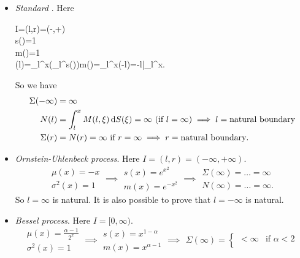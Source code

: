 \documentclass[12pt]{report}
\begin{document}
\begin{itemize}
	\item \emph{Standard \bwm}. Here
	\begin{carray}
		I=(l,r)=(-\infty,+\infty)\\
		s(\xi)=1\\
		m(\xi)=1\\
		\Sigma(l)=\int_{l}^{x}\left(\int_{l}^{\xi}s(\eta)\dif\eta\right)m(\xi)\dif\xi=\int_{l}^{x}(\xi-l)\dif\xi=-l\xi\Big|_{l}^{x}.
	\end{carray}
	So we have
	\begin{align*}
		\Sigma(-\infty)&=\infty\\
		N(l)&=\int_{l}^{x}M(l,\xi)\mathop{}\!\mathrm{d} S(\xi)=\infty\text{ (if $l=\infty$)}\implies l=\text{natural boundary}\\
		\Sigma(r)&=N(r)=\infty\text{ if }r=\infty\implies r=\text{natural boundary}.
	\end{align*}
	\item \emph{Ornstein-Uhlenbeck process}. Here $I=(l,r)=(-\infty,+\infty)$.
	\begin{equation*}
		\begin{array}{l}
			\mu(x)=-x\\
			\sigma^{2}(x)=1
		\end{array}\implies\begin{array}{l}
		s(x)=e^{x^{2}}\\
		m(x)=e^{-x^{2}}
		\end{array}\implies\begin{array}{l}
		\Sigma(\infty)=\ldots=\infty\\
		N(\infty)=\ldots=\infty.
		\end{array}
	\end{equation*}
	So $l=\infty$ is natural. It is also possible to prove that $l=-\infty$ is natural.
	\item \emph{Bessel process}. Here $I=[0,\infty)$.
	\begin{equation*}
		\begin{array}{l}
			\mu(x)=\frac{\alpha-1}{2^{x}}\\
			\sigma^{2}(x)=1
		\end{array}\implies\begin{array}{l}
			s(x)=x^{1-\alpha}\\
			m(x)=x^{\alpha-1}
		\end{array}\implies\begin{array}{l}
			\Sigma(\infty)=\begin{cases}
				<\infty&\text{if }\alpha<2\\

\end{cases}
\end{array}
\end{equation*}
\end{itemize}
\end{document}
